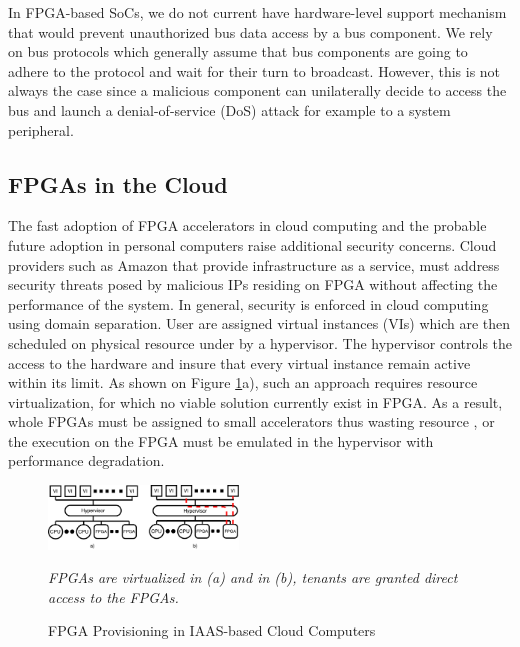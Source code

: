 \documentclass[sigconf]{acmart}
\theoremstyle{plain}
\theoremstyle{remark}
\begin{document}
In FPGA-based SoCs, we do not current have hardware-level support mechanism that would prevent unauthorized bus data access by a bus component. We rely on bus protocols which generally assume that bus components are going to adhere to the protocol and wait for their turn to broadcast. However, this is not always the case since a malicious component can unilaterally decide to access the bus and launch a denial-of-service (DoS) attack for example to a system peripheral.



\subsection{FPGAs in the Cloud}

The fast adoption of FPGA accelerators in cloud computing and the probable future adoption in personal computers raise additional security concerns. Cloud providers such as Amazon that provide infrastructure as a service, must address security threats posed by malicious IPs residing on FPGA without affecting the performance of the system. In general, security is enforced in cloud computing using domain separation. User are assigned virtual instances (VIs) which are then scheduled on physical resource under by a hypervisor. The hypervisor controls the access to the hardware and insure that every virtual instance remain active within its limit. As shown on Figure \ref{fig:iaas-fpga}a), such an approach requires resource virtualization, for which no viable solution currently exist in FPGA. As a result, whole FPGAs must be assigned to small accelerators thus wasting resource , or the execution on the FPGA must be emulated in the hypervisor with performance degradation.

\begin{figure}[h]
\centering
\includegraphics[width=0.45\textwidth]{figures/CloudThreatModel.pdf}
\caption{FPGA Provisioning in IAAS-based Cloud Computers}
\textit{FPGAs are virtualized in (a) and in (b), tenants are granted direct access to the FPGAs.}
\label{fig:iaas-fpga}
\end{figure}
\end{document}
